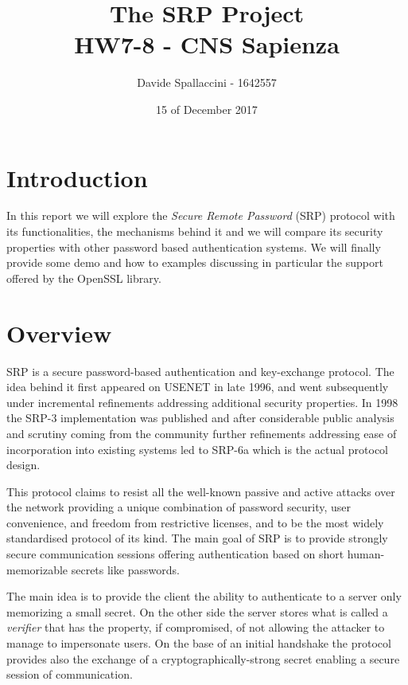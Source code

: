 \documentclass[11pt]{article}
\begin{document}
\title{The SRP Project\\ HW7-8 - CNS Sapienza}
\author{Davide Spallaccini - 1642557}
\date{15 of December 2017}
\maketitle

\section{Introduction}
In this report we will explore the \emph{Secure Remote Password} (SRP) protocol with its functionalities, the mechanisms behind it and we will compare its security properties with other password based authentication systems. We will finally provide some demo and how to examples discussing in particular the support offered by the OpenSSL library.

\section{Overview}
SRP is a secure password-based authentication and key-exchange protocol. The idea behind it first appeared on USENET in late 1996, and went subsequently under incremental refinements addressing additional security properties. In 1998 the SRP-3 implementation was published and after considerable public analysis and scrutiny coming from the community further refinements addressing ease of incorporation into existing systems led to SRP-6a which is the actual protocol design.

This protocol claims to resist all the well-known passive and active attacks over the network providing a unique combination of password security, user convenience, and freedom from restrictive licenses, and to be the most widely standardised protocol of its kind. The main goal of SRP is to provide strongly secure communication sessions offering authentication based on short human-memorizable secrets like passwords.

The main idea is to provide the client the ability to authenticate to a server only memorizing a small secret. On the other side the server stores what is called a \emph{verifier} that has the property, if compromised, of not allowing the attacker to manage to impersonate users. On the base of an initial handshake the protocol provides also the exchange of a cryptographically-strong secret enabling a secure session of communication.
\end{document}
